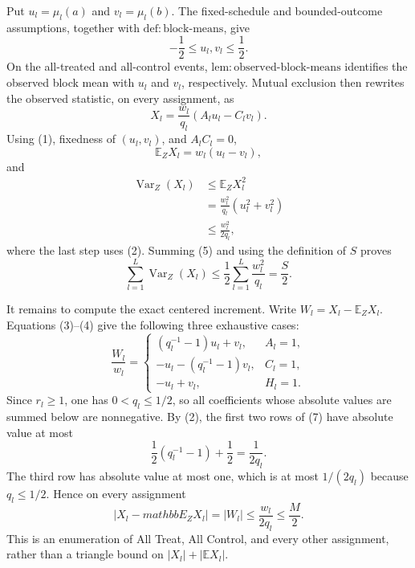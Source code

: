 Put \(u_l=\mu_l(a)\) and \(v_l=\mu_l(b)\).  The fixed-schedule and
bounded-outcome assumptions, together with
\(\mathrm{def{:}block\text{-}means}\), give
\[
 -\frac12\le u_l,v_l\le\frac12.
\tag{2}
\]
On the all-treated and all-control events,
\(\mathrm{lem{:}observed\text{-}block\text{-}means}\) identifies the
observed block mean with \(u_l\) and \(v_l\), respectively.  Mutual
exclusion then rewrites the observed statistic, on every assignment,
as
\[
 X_l=\frac{w_l}{q_l}(A_lu_l-C_lv_l).
\tag{3}
\]
Using (1), fixedness of \((u_l,v_l)\), and \(A_lC_l=0\),
\[
 \mathbb E_ZX_l=w_l(u_l-v_l),
\tag{4}
\]
and
\[
\begin{aligned}
 \operatorname{Var}_Z(X_l)
 &\le \mathbb E_ZX_l^2\\
 &=\frac{w_l^2}{q_l}(u_l^2+v_l^2)\\
 &\le\frac{w_l^2}{2q_l},
\end{aligned}
\tag{5}
\]
where the last step uses (2).  Summing (5) and using the definition of
\(S\) proves
\[
 \sum_{l=1}^L\operatorname{Var}_Z(X_l)
 \le\frac12\sum_{l=1}^L\frac{w_l^2}{q_l}=\frac S2.
\tag{6}
\]

It remains to compute the exact centered increment.  Write
\(W_l=X_l-\mathbb E_ZX_l\).  Equations (3)--(4) give the following
three exhaustive cases:
\[
 \frac{W_l}{w_l}=
 \begin{cases}
  (q_l^{-1}-1)u_l+v_l,&A_l=1,\\
  -u_l-(q_l^{-1}-1)v_l,&C_l=1,\\
  -u_l+v_l,&H_l=1.
 \end{cases}
\tag{7}
\]
Since \(r_l\ge1\), one has \(0<q_l\le1/2\), so all coefficients
whose absolute values are summed below are nonnegative.  By (2), the
first two rows of (7) have absolute value at most
\[
 \frac12(q_l^{-1}-1)+\frac12=\frac1{2q_l}.
\tag{8}
\]
The third row has absolute value at most one, which is at most
\(1/(2q_l)\) because \(q_l\le1/2\).  Hence on every assignment
\[
 |X_l-mathbb E_ZX_l|=|W_l|
 \le\frac{w_l}{2q_l}\le\frac M2.
\tag{9}
\]
This is an enumeration of All Treat, All Control, and every other
assignment, rather than a triangle bound on \(|X_l|+|\mathbb EX_l|\).

